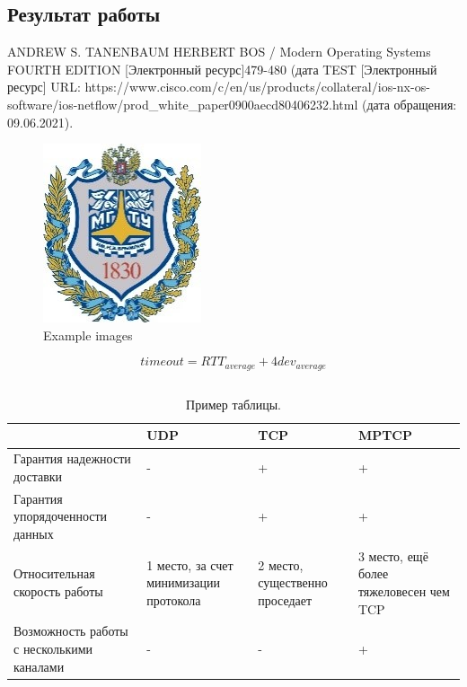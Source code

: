 \documentclass[14pt, a4paper]{extarticle}
\begin{document}
\subsection{Результат работы}

\clearpage
\begin{thebibliography}{9}
	 ANDREW S. TANENBAUM
HERBERT BOS /  Modern Operating Systems FOURTH EDITION [Электронный ресурс]479-480 (дата
	 TEST [Электронный ресурс] URL: https://www.cisco.com/c/en/us/products/collateral/ios-nx-os-software/ios-netflow/prod\_white\_paper0900aecd80406232.html (дата обращения: 09.06.2021).
\end{thebibliography}

\begin{figure}[H]
	\centering
	\includegraphics[scale=0.9]{b_logo.jpg}
	\caption{Example images}
\end{figure}

\begin{equation}
	timeout =  RTT_{average} + 4 dev_{average}
\end{equation}

\begin{lstlisting}[caption=lst example]
\end{lstlisting}

\begin{table}[H]
\caption{Пример таблицы.}
\begin{center}
\begin{tabular}{ |p{4cm} |p{3cm}| p{3cm} | p{4cm}|}
\hline
 & UDP & TCP & MPTCP \\ \hline 
Гарантия надежности доставки & - & + & + \\ \hline 
Гарантия упорядоченности данных  & - & +  & + \\ \hline 
Относительная скорость работы & 1 место, за счет минимизации протокола & 2 место, существенно проседает & 3 место, ещё более тяжеловесен чем TCP \\ \hline
Возможность работы с несколькими каналами & - & - & + \\ \hline 
\end{tabular}
\end{center}
\label{tableProt}
\end{table}
\end{document}
